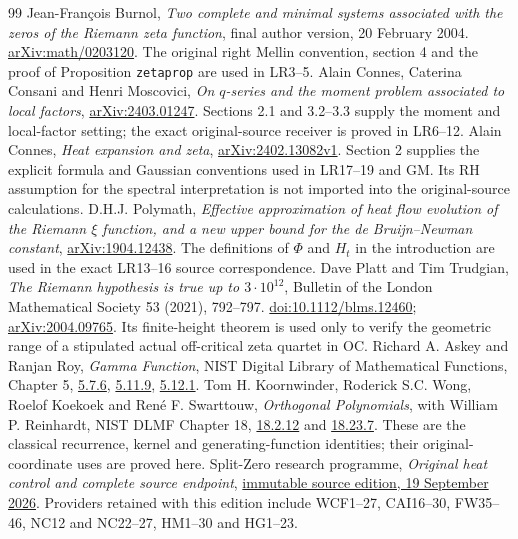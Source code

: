 \begin{thebibliography}{99}
 Jean-Fran\c cois Burnol,
\emph{Two complete and minimal systems associated with the zeros of the
Riemann zeta function}, final author version, 20 February 2004.
\href{https://arxiv.org/abs/math/0203120}{arXiv:math/0203120}.
The original right Mellin convention, section 4 and the proof of
Proposition \texttt{zetaprop} are used in LR3--5.
 Alain Connes, Caterina Consani and Henri Moscovici,
\emph{On $q$-series and the moment problem associated to local factors},
\href{https://arxiv.org/abs/2403.01247}{arXiv:2403.01247}.
Sections 2.1 and 3.2--3.3 supply the moment and local-factor setting;
the exact original-source receiver is proved in LR6--12.
 Alain Connes, \emph{Heat expansion and zeta},
\href{https://arxiv.org/abs/2402.13082v1}{arXiv:2402.13082v1}.
Section 2 supplies the explicit formula and Gaussian conventions used
in LR17--19 and GM. Its RH assumption for the spectral interpretation
is not imported into the original-source calculations.
 D.H.J. Polymath, \emph{Effective approximation of
heat flow evolution of the Riemann $\xi$ function, and a new upper
bound for the de Bruijn--Newman constant},
\href{https://arxiv.org/abs/1904.12438}{arXiv:1904.12438}.
The definitions of $\Phi$ and $H_t$ in the introduction are used in
the exact LR13--16 source correspondence.
 Dave Platt and Tim Trudgian,
\emph{The Riemann hypothesis is true up to $3\cdot10^{12}$},
Bulletin of the London Mathematical Society 53 (2021), 792--797.
\href{https://doi.org/10.1112/blms.12460}{doi:10.1112/blms.12460};
\href{https://arxiv.org/abs/2004.09765}{arXiv:2004.09765}.
Its finite-height theorem is used only to verify the geometric range
of a stipulated actual off-critical zeta quartet in OC.
 Richard A. Askey and Ranjan Roy,
\emph{Gamma Function}, NIST Digital Library of Mathematical Functions,
Chapter 5, \href{https://dlmf.nist.gov/5.7.E6}{5.7.6},
\href{https://dlmf.nist.gov/5.11.E9}{5.11.9},
\href{https://dlmf.nist.gov/5.12.E1}{5.12.1}.
 Tom H. Koornwinder, Roderick S.C. Wong, Roelof Koekoek
and Ren\'e F. Swarttouw, \emph{Orthogonal Polynomials}, with
William P. Reinhardt, NIST DLMF Chapter 18,
\href{https://dlmf.nist.gov/18.2.E12}{18.2.12} and
\href{https://dlmf.nist.gov/18.23.E7}{18.23.7}.
These are the classical recurrence, kernel and generating-function
identities; their original-coordinate uses are proved here.
 Split-Zero research programme,
\emph{Original heat control and complete source endpoint},
\href{https://github.com/KokunoYumeto/zeta-function-research-reader/tree/1445091fd84d47b3908f56d4db1f8a28acd134da/workbenches/splitzero-tandem/continuations/20260919-original-heat-source-endpoint}{immutable source edition, 19 September 2026}.
Providers retained with this edition include WCF1--27, CAI16--30,
FW35--46, NC12 and NC22--27, HM1--30 and HG1--23.
\end{thebibliography}

\endgroup
